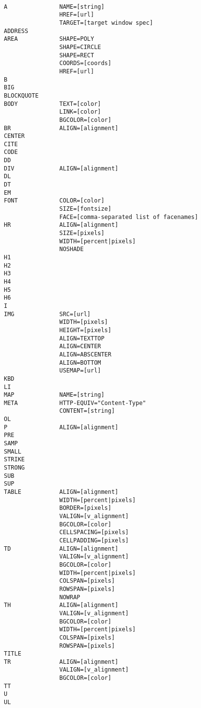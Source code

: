 \begin{verbatim}

A               NAME=[string]
                HREF=[url]
                TARGET=[target window spec]
ADDRESS
AREA            SHAPE=POLY
                SHAPE=CIRCLE
                SHAPE=RECT
                COORDS=[coords]
                HREF=[url]
B
BIG
BLOCKQUOTE
BODY            TEXT=[color]
                LINK=[color]
                BGCOLOR=[color]
BR              ALIGN=[alignment]
CENTER
CITE
CODE
DD
DIV             ALIGN=[alignment]
DL
DT
EM
FONT            COLOR=[color]
                SIZE=[fontsize]
                FACE=[comma-separated list of facenames]
HR              ALIGN=[alignment]
                SIZE=[pixels]
                WIDTH=[percent|pixels]
                NOSHADE
H1
H2
H3
H4
H5
H6
I
IMG             SRC=[url]
                WIDTH=[pixels]
                HEIGHT=[pixels]
                ALIGN=TEXTTOP
                ALIGN=CENTER
                ALIGN=ABSCENTER
                ALIGN=BOTTOM
                USEMAP=[url]
KBD
LI
MAP             NAME=[string]
META            HTTP-EQUIV="Content-Type"
                CONTENT=[string]
OL
P               ALIGN=[alignment]
PRE
SAMP
SMALL
STRIKE
STRONG
SUB
SUP
TABLE           ALIGN=[alignment]
                WIDTH=[percent|pixels]
                BORDER=[pixels]
                VALIGN=[v_alignment]
                BGCOLOR=[color]
                CELLSPACING=[pixels]
                CELLPADDING=[pixels]
TD              ALIGN=[alignment]
                VALIGN=[v_alignment]
                BGCOLOR=[color]
                WIDTH=[percent|pixels]
                COLSPAN=[pixels]
                ROWSPAN=[pixels]
                NOWRAP
TH              ALIGN=[alignment]
                VALIGN=[v_alignment]
                BGCOLOR=[color]
                WIDTH=[percent|pixels]
                COLSPAN=[pixels]
                ROWSPAN=[pixels]
TITLE
TR              ALIGN=[alignment]
                VALIGN=[v_alignment]
                BGCOLOR=[color]
TT
U
UL

\end{verbatim}

